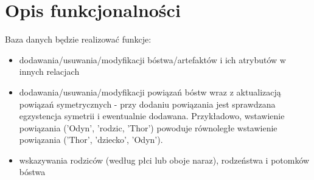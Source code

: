 \documentclass[11pt]{article}
\begin{document}
\section{Opis funkcjonalności}

Baza danych będzie realizować funkcje:
\begin{itemize}
	\item dodawania/usuwania/modyfikacji bóstwa/artefaktów i ich atrybutów w innych relacjach
	\item dodawania/usuwania/modyfikacji powiązań bóstw wraz z aktualizacją powiązań symetrycznych - przy dodaniu powiązania jest sprawdzana egzystencja symetrii i ewentualnie dodawana. Przykładowo, wstawienie powiązania ('Odyn', 'rodzic, 'Thor') powoduje równoległe wstawienie powiązania ('Thor', 'dziecko', 'Odyn').
	\item wskazywania rodziców (według płci lub oboje naraz), rodzeństwa i potomków bóstwa
\end{itemize}
\end{document}

